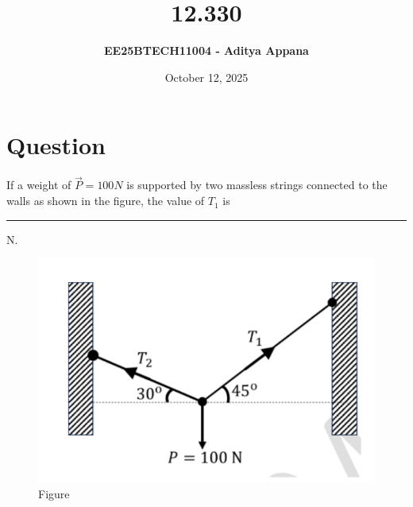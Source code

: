 \documentclass[12pt]{article}
\title{\textbf{12.330}}
\author{\textbf{EE25BTECH11004 - Aditya Appana}}
\date{October 12, 2025}
\begin{document}
\maketitle

\section*{Question}
If a weight of $\vec{P}= 100N$ is supported by two massless strings connected to the walls
as shown in the figure, the value of $T_1$ is \rule{1.5cm}{0.15mm} N. 
\begin{figure}[H]
    \centering
    \includegraphics[width=0.4\columnwidth]{Figs/123301.png}
    \caption{Figure}
    \label{fig:placeholder}
\end{figure}
\end{document}
